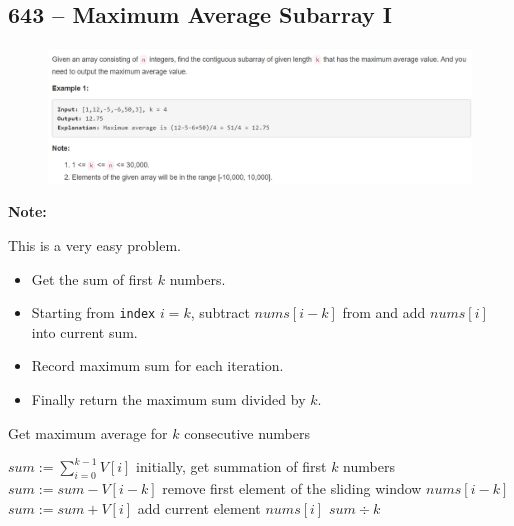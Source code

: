 \documentclass[a4paper,12pt]{article}
\begin{document}
\subsection{643 -- Maximum Average Subarray I}
\begin{figure}[H]
	\begin{center}
		\includegraphics[width=18cm]{643.png}
	\end{center}
\end{figure}
\textbf{\large{Note:}}
\par
\vspace{0.5em}
This is a very easy problem.
\begin{itemize}
\item Get the sum of first $k$ numbers.
\item Starting from \texttt{index} $i = k$, subtract $nums[i - k]$ from and add $nums[i]$ into current sum.
\item Record maximum sum for each iteration.
\item Finally return the maximum sum divided by $k$.
\end{itemize}
\setcounter{algorithm}{0}
\begin{algorithm}[H]
\caption{Get maximum average for $k$ consecutive numbers}
\begin{algorithmic}
\Statex
{}
\State $sum := \sum\limits_{i=0}^{k-1}{V[i]} $ \Comment initially, get summation of first $k$ numbers
\State $sum := sum - V[i-k]$ \Comment remove first element of the sliding window $nums[i-k]$
\State $sum := sum + V[i]$ \Comment add current element $nums[i]$
\EndFor
\State \Return $sum \div k$
\EndProcedure
\Statex
\end{algorithmic}
\end{algorithm}
\end{document}
